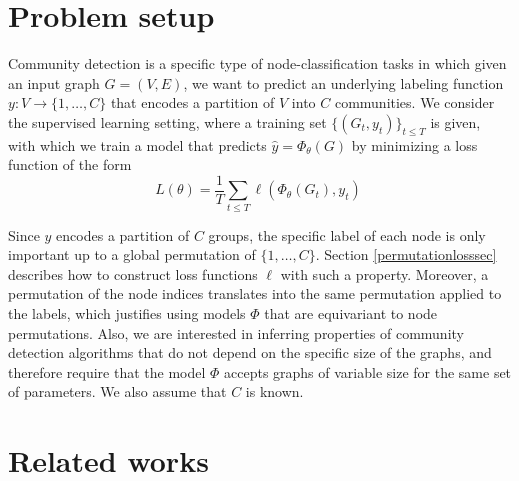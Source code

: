 \documentclass{article} \usepackage{iclr2019_conference,times}
\begin{document}
 
 
\section{Problem setup}
\label{setupsect}





Community detection is a specific type of node-classification tasks in which 
given an input graph $G = (V,E)$, we want to predict an underlying labeling function $y: V \to \{1, \dots, C\}$ that encodes a partition of $V$ into $C$ communities. 
We consider the supervised learning setting, where a training set $\{ (G_t, y_t) \}_{t \leq T}$ is given, with which we train a model that predicts $\hat{y} = \Phi_{\theta}(G)$ by minimizing a loss function of the form
$$L(\theta) = \frac{1}{T} \sum_{t \leq T} \ell( \Phi_{\theta}(G_t), y_t)~$$
\vspace{-0.4cm}

Since $y$ encodes a partition of $C$ groups, the specific label of each node is only important up to a global permutation of $\{1, \dots, C\}$. Section \ref{permutationlosssec} describes how to construct loss functions $\ell$ with such a property. 
Moreover, a permutation of the node indices translates into the same permutation applied to the labels, which justifies using models $\Phi$ that are equivariant to node permutations. Also, we are interested in inferring properties of community detection algorithms that do not depend on the specific size of the graphs, and therefore require that the model $\Phi$ accepts graphs of variable size for the same set of parameters. We also assume that $C$ is known.













 

\section{Related works}
\label{relatedsect}
\end{document}
